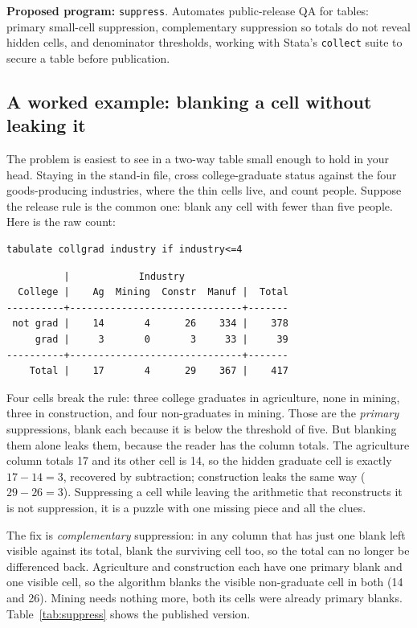\documentclass[
    a4paper,
    fontsize=10pt,
    twoside=true,
    numbers=noenddot,
]{kaobook}
\begin{document}
\begin{kaobox}[frametitle=Ado-file Idea: \texttt{suppress}]
\textbf{Proposed program:} \texttt{suppress}. Automates public-release QA for tables: primary small-cell suppression, complementary suppression so totals do not reveal hidden cells, and denominator thresholds, working with Stata's \texttt{collect} suite to secure a table before publication.
\end{kaobox}

\subsection{A worked example: blanking a cell without leaking it}\label{sec:supexample}
The problem is easiest to see in a two-way table small enough to hold in your head. Staying in the stand-in file, cross college-graduate status against the four goods-producing industries, where the thin cells live, and count people. Suppose the release rule is the common one: blank any cell with fewer than five people. Here is the raw count:
{\footnotesize
\begin{verbatim}
tabulate collgrad industry if industry<=4
\end{verbatim}
}
{\footnotesize
\begin{verbatim}
          |            Industry
  College |    Ag  Mining  Constr  Manuf |  Total
----------+------------------------------+-------
 not grad |    14       4      26    334 |    378
     grad |     3       0       3     33 |     39
----------+------------------------------+-------
    Total |    17       4      29    367 |    417
\end{verbatim}
}
Four cells break the rule: three college graduates in agriculture, none in mining, three in construction, and four non-graduates in mining. Those are the \emph{primary} suppressions, blank each because it is below the threshold of five. But blanking them alone leaks them, because the reader has the column totals. The agriculture column totals 17 and its other cell is 14, so the hidden graduate cell is exactly $17-14=3$, recovered by subtraction; construction leaks the same way ($29-26=3$). Suppressing a cell while leaving the arithmetic that reconstructs it is not suppression, it is a puzzle with one missing piece and all the clues.

The fix is \emph{complementary} suppression: in any column that has just one blank left visible against its total, blank the surviving cell too, so the total can no longer be differenced back. Agriculture and construction each have one primary blank and one visible cell, so the algorithm blanks the visible non-graduate cell in both (14 and 26). Mining needs nothing more, both its cells were already primary blanks. Table~\ref{tab:suppress} shows the published version.
\end{document}
